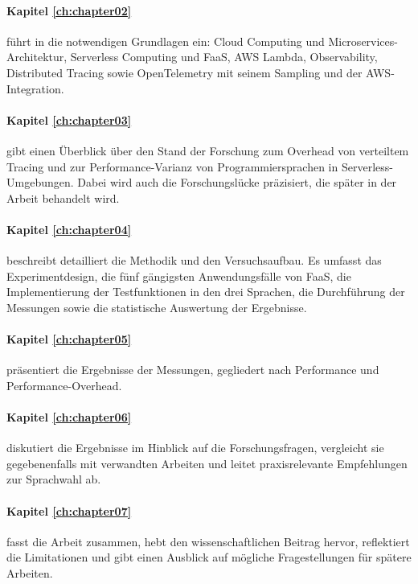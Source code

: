 \paragraph{Kapitel \ref{ch:chapter02}} führt in die notwendigen Grundlagen ein: Cloud Computing und Microservices-Architektur, Serverless Computing und FaaS, AWS Lambda, Observability, Distributed Tracing sowie OpenTelemetry mit seinem Sampling und der AWS-Integration.

\paragraph{Kapitel \ref{ch:chapter03}} gibt einen Überblick über den Stand der Forschung zum Overhead von verteiltem Tracing und zur Performance-Varianz von Programmiersprachen in Serverless-Umgebungen. Dabei wird auch die Forschungslücke präzisiert, die später in der Arbeit behandelt wird.

\paragraph{Kapitel \ref{ch:chapter04}} beschreibt detailliert die Methodik und den Versuchsaufbau. Es umfasst das Experimentdesign, die fünf gängigsten Anwendungsfälle von \ac{FaaS}, die Implementierung der Testfunktionen in den drei Sprachen, die Durchführung der Messungen sowie die statistische Auswertung der Ergebnisse.

\paragraph{Kapitel \ref{ch:chapter05}} präsentiert die Ergebnisse der Messungen, gegliedert nach Performance und Performance-Overhead.

\paragraph{Kapitel \ref{ch:chapter06}} diskutiert die Ergebnisse im Hinblick auf die Forschungsfragen, vergleicht sie gegebenenfalls mit verwandten Arbeiten 
und leitet praxisrelevante Empfehlungen zur Sprachwahl ab.

\paragraph{Kapitel \ref{ch:chapter07}} fasst die Arbeit zusammen, hebt den wissenschaftlichen Beitrag hervor, reflektiert die Limitationen und gibt einen Ausblick auf mögliche Fragestellungen für spätere Arbeiten.
